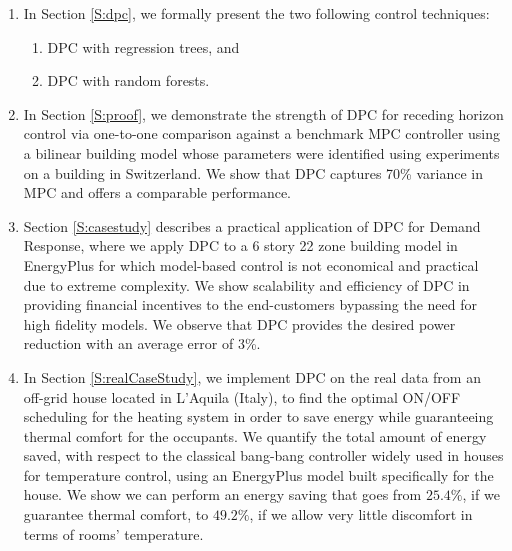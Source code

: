 \begin{enumerate}
	\item In Section \ref{S:dpc}, we formally present the two following control techniques:
	\begin{enumerate}
		\item DPC with regression trees, and
		\item DPC with random forests.
	\end{enumerate}
	\item In Section \ref{S:proof}, we demonstrate the strength of DPC for receding horizon control via one-to-one comparison against a benchmark MPC controller using a bilinear building model whose parameters were identified using experiments on a building in Switzerland. We show that DPC captures 70\% variance in MPC and offers a comparable performance.
	\item Section \ref{S:casestudy} describes a practical application of DPC for Demand Response, where we apply DPC to a 6 story 22 zone building model in EnergyPlus \cite{Crawley2001} for which model-based control is not economical and practical due to extreme complexity. We show scalability and efficiency of DPC in providing financial incentives to the end-customers bypassing the need for high fidelity models. We observe that DPC provides the desired power reduction with an average error of 3\%.
	\item In Section \ref{S:realCaseStudy}, we implement DPC on the real data from an off-grid house located in L'Aquila (Italy), to find the optimal ON/OFF scheduling for the heating system in order to save energy while guaranteeing thermal comfort for the occupants. We quantify the total amount of energy saved, with respect to the classical bang-bang controller widely used in houses for temperature control, using an EnergyPlus model built specifically for the house. We show we can perform an energy saving that goes from $25.4\%$, if we guarantee thermal comfort, to $49.2\%$, if we allow very little discomfort in terms of rooms' temperature.
\end{enumerate}